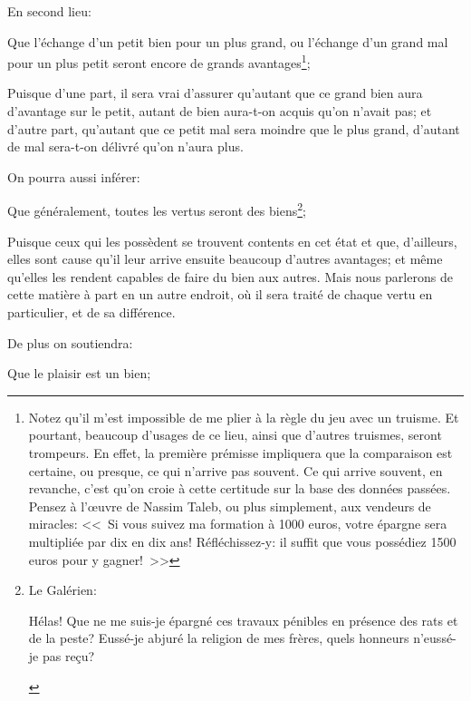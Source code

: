 \bigbreak

En second lieu:

\begin{lieu}
	Que l'échange d'un petit bien pour un plus grand, ou l'échange d'un grand mal pour un plus petit seront encore de
	grands avantages\footnote{Notez qu'il m'est impossible de me plier à la règle du jeu avec un truisme. Et pourtant,
	beaucoup d'usages de ce lieu, ainsi que d'autres truismes, seront trompeurs. En effet, la première prémisse
	impliquera que la comparaison est certaine, ou presque, ce qui n'arrive pas souvent. Ce qui arrive souvent, en
	revanche, c'est qu'on croie à cette certitude sur la base des données passées. Pensez à l’œuvre de Nassim Taleb,
	ou plus simplement, aux vendeurs de miracles: <<~Si vous suivez ma formation à 1000 euros, votre épargne sera
	multipliée par dix en dix ans! Réfléchissez-y: il suffit que vous possédiez 1500 euros pour y gagner!~>>};
\end{lieu}

Puisque d'une part, il sera vrai d'assurer qu'autant que ce grand bien aura d'avantage sur le petit, autant de bien
aura-t-on acquis qu'on n'avait pas; et d'autre part, qu'autant que ce petit mal sera moindre que le plus grand,
d'autant de mal sera-t-on délivré qu'on n'aura plus.

\bigbreak

On pourra aussi inférer:

\begin{lieu}
	Que généralement, toutes les vertus seront des biens\footnote{Le Galérien: \begin{emphpar}\normalfont
	Hélas! Que ne me suis-je épargné ces travaux pénibles en présence des rats et de la peste?
	Eussé-je abjuré la religion de mes frères, quels honneurs n'eussé-je pas reçu?\end{emphpar}};
\end{lieu}

Puisque ceux qui les possèdent se trouvent contents en cet état et que, d'ailleurs, elles sont cause qu'il leur arrive
ensuite beaucoup d'autres avantages; et même qu'elles les rendent capables de faire du bien aux autres. Mais nous
parlerons de cette matière à part en un autre endroit, où il sera traité de chaque vertu en particulier, et de sa
différence.

\bigbreak

De plus on soutiendra:

\begin{lieu}
	Que le plaisir est un bien;
\end{lieu}

